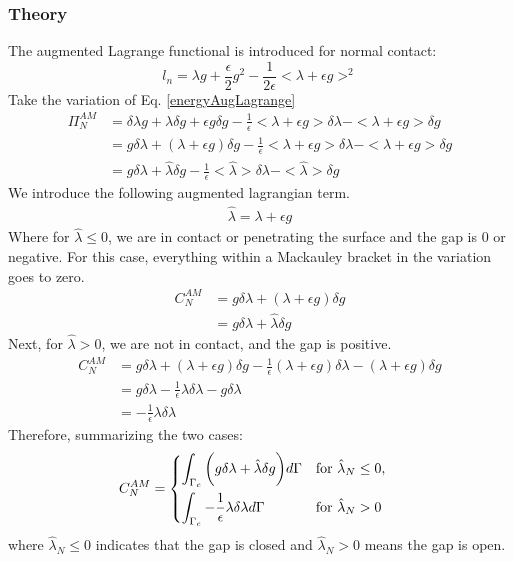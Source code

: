 \documentclass[12pt]{article}
\numberwithin{equation}{section}
\begin{document}
\subsubsection{Theory}
The augmented Lagrange functional is introduced for normal contact: 
\begin{equation}\label{energyAugLagrange}
l_n = \lambda g + \frac{\epsilon}{2} g^2 - \frac{1}{2 \epsilon} <\lambda + \epsilon g>^2 
\end{equation}
Take the variation of Eq. \ref{energyAugLagrange}
\begin{align*}
\Pi_N^{AM} &= \delta \lambda g + \lambda \delta g + \epsilon g \delta g - \frac{1}{\epsilon}  <\lambda +  \epsilon g> \delta \lambda - <\lambda +  \epsilon g> \delta g \\
		&= g \delta \lambda + (\lambda + \epsilon g) \delta g - \frac{1}{\epsilon}  <\lambda +  \epsilon g> \delta \lambda - <\lambda +  \epsilon g> \delta g \\
		&= g \delta \lambda + \hat{\lambda} \delta g - \frac{1}{\epsilon}  <\hat{\lambda}> \delta \lambda - <\hat{\lambda}> \delta g
\end{align*}
We introduce the following augmented lagrangian term.
\begin{align*}
\hat{\lambda} = \lambda + \epsilon g
\end{align*}
Where for $\hat{\lambda} \leq 0$, we are in contact or penetrating the surface and the gap is 0 or negative. For this case, everything within a Mackauley bracket in the variation goes to zero. 
\begin{align*}
C_N^{AM} &= g \delta \lambda + (\lambda + \epsilon g) \delta g \\
		&= g \delta \lambda + \hat{\lambda} \delta g 
\end{align*}
Next, for $\hat{\lambda} > 0$, we are not in contact, and the gap is positive. 
\begin{align*}
C_N^{AM} &= g \delta \lambda + (\lambda + \epsilon g) \delta g - \frac{1}{\epsilon} (\lambda +  \epsilon g) \delta \lambda - (\lambda +  \epsilon g) \delta g \\
		&= g \delta \lambda - \frac{1}{\epsilon} \lambda \delta \lambda - g \delta \lambda \\
		&= - \frac{1}{\epsilon} \lambda \delta \lambda
\end{align*}
Therefore, summarizing the two cases: 
\begin{align}\label{659}
C_{N}^{AM} &= 
\begin{dcases}
    \int_{\Gamma_c} \bigg( g \delta \lambda + \hat{\lambda} \delta g \bigg) d \Gamma & \text{for } \hat{\lambda}_N \leq 0, \\
    \int_{\Gamma_c} -\frac{1}{\epsilon} \lambda \delta \lambda d \Gamma               & \text{for } \hat{\lambda}_N > 0
\end{dcases}
\end{align}
where $ \hat{\lambda}_N \leq 0$ indicates that the gap is closed and $\hat{\lambda}_N > 0$ means the gap is open. 
\end{document}
